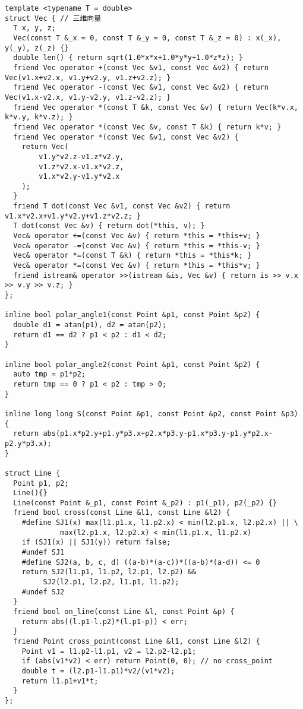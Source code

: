 \documentclass[12pt]{article}
\begin{document}
{{{{{{{{{{\begin{lstlisting}
template <typename T = double>
struct Vec { // 三维向量
  T x, y, z;
  Vec(const T &_x = 0, const T &_y = 0, const T &_z = 0) : x(_x), y(_y), z(_z) {}
  double len() { return sqrt(1.0*x*x+1.0*y*y+1.0*z*z); }
  friend Vec operator +(const Vec &v1, const Vec &v2) { return Vec(v1.x+v2.x, v1.y+v2.y, v1.z+v2.z); }
  friend Vec operator -(const Vec &v1, const Vec &v2) { return Vec(v1.x-v2.x, v1.y-v2.y, v1.z-v2.z); }
  friend Vec operator *(const T &k, const Vec &v) { return Vec(k*v.x, k*v.y, k*v.z); }
  friend Vec operator *(const Vec &v, const T &k) { return k*v; }
  friend Vec operator *(const Vec &v1, const Vec &v2) {
    return Vec(
        v1.y*v2.z-v1.z*v2.y,
        v1.z*v2.x-v1.x*v2.z,
        v1.x*v2.y-v1.y*v2.x
    );
  }
  friend T dot(const Vec &v1, const Vec &v2) { return v1.x*v2.x+v1.y*v2.y+v1.z*v2.z; }
  T dot(const Vec &v) { return dot(*this, v); }
  Vec& operator +=(const Vec &v) { return *this = *this+v; }
  Vec& operator -=(const Vec &v) { return *this = *this-v; }
  Vec& operator *=(const T &k) { return *this = *this*k; }
  Vec& operator *=(const Vec &v) { return *this = *this*v; }
  friend istream& operator >>(istream &is, Vec &v) { return is >> v.x >> v.y >> v.z; }
};

inline bool polar_angle1(const Point &p1, const Point &p2) {
  double d1 = atan(p1), d2 = atan(p2); 
  return d1 == d2 ? p1 < p2 : d1 < d2;
}

inline bool polar_angle2(const Point &p1, const Point &p2) {
  auto tmp = p1*p2;
  return tmp == 0 ? p1 < p2 : tmp > 0;
}

inline long long S(const Point &p1, const Point &p2, const Point &p3) {
  return abs(p1.x*p2.y+p1.y*p3.x+p2.x*p3.y-p1.x*p3.y-p1.y*p2.x-p2.y*p3.x);
}

struct Line {
  Point p1, p2;
  Line(){}
  Line(const Point &_p1, const Point &_p2) : p1(_p1), p2(_p2) {}
  friend bool cross(const Line &l1, const Line &l2) {
    #define SJ1(x) max(l1.p1.x, l1.p2.x) < min(l2.p1.x, l2.p2.x) || \
             max(l2.p1.x, l2.p2.x) < min(l1.p1.x, l1.p2.x)
    if (SJ1(x) || SJ1(y)) return false;
    #undef SJ1
    #define SJ2(a, b, c, d) ((a-b)*(a-c))*((a-b)*(a-d)) <= 0
    return SJ2(l1.p1, l1.p2, l2.p1, l2.p2) &&
         SJ2(l2.p1, l2.p2, l1.p1, l1.p2);
    #undef SJ2
  }
  friend bool on_line(const Line &l, const Point &p) {
    return abs((l.p1-l.p2)*(l.p1-p)) < err;
  }
  friend Point cross_point(const Line &l1, const Line &l2) {
    Point v1 = l1.p2-l1.p1, v2 = l2.p2-l2.p1;
    if (abs(v1*v2) < err) return Point(0, 0); // no cross_point
    double t = (l2.p1-l1.p1)*v2/(v1*v2);
    return l1.p1+v1*t;
  }
};


\end{lstlisting}}}}}}}}}}}
\end{document}
